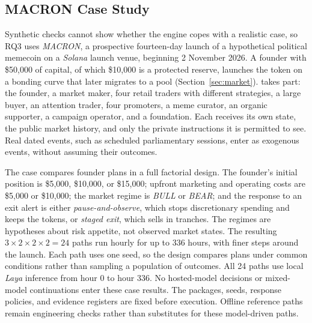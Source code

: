 \subsection{MACRON Case Study}\label{sec:eval-macron}
Synthetic checks cannot show whether the engine copes with a realistic case,
so RQ3 uses \textit{MACRON}, a prospective fourteen-day launch of a
hypothetical political memecoin on a \textit{Solana} launch venue, beginning
2 November 2026. A founder with \$50{,}000 of capital, of which \$10{,}000 is a
protected reserve, launches the token on a bonding curve that later migrates
to a pool (Section~\ref{sec:market}).  takes part: the founder, a
market maker, four retail traders with different strategies, a large buyer, an
attention trader, four promoters, a meme curator, an organic supporter, a
campaign operator, and a foundation. Each  receives its own state, the public
market history, and only the private instructions it is permitted to see.
Real dated events, such as scheduled parliamentary sessions, enter as
exogenous events, without assuming their outcomes.

The case compares founder plans in a full factorial design. The founder's
initial position is \$5{,}000, \$10{,}000, or \$15{,}000; upfront marketing and
operating costs are \$5{,}000 or \$10{,}000; the market regime is
\textit{BULL} or \textit{BEAR}; and the response to an exit alert is either
\textit{pause-and-observe}, which stops discretionary spending and keeps the
tokens, or \textit{staged exit}, which sells in tranches. The regimes are
hypotheses about risk appetite, not observed market states. The resulting
$3\times2\times2\times2=24$ paths run hourly for up to 336 hours, with finer
steps around the launch. Each path uses one seed, so the design compares plans
under common conditions rather than sampling a population of outcomes. All 24 paths use local \textit{Laya} inference from hour 0 to hour 336.
No hosted-model decisions or mixed-model continuations enter these case results.
The packages, seeds, response policies, and evidence registers are fixed before
execution. Offline reference paths remain engineering checks rather than
substitutes for these model-driven paths.

